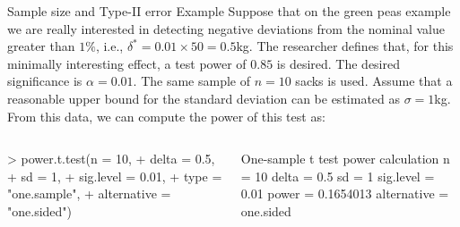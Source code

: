 \documentclass[t]{beamer}
\begin{document}
\begin{ftstf}
{Sample size and Type-II error}
{Example}
Suppose that on the green peas example we are really interested in detecting negative deviations from the nominal value greater than $1\%$, i.e., $\delta^* = 0.01\times 50 = 0.5$kg. The researcher defines that, for this minimally interesting effect, a test power of $0.85$ is desired. The desired significance is $\alpha = 0.01$.
\vone
The same sample of $n=10$ sacks is used. Assume that a reasonable upper bound for the standard deviation can be estimated as $\sigma=1$kg. From this data, we can compute the power of this test as:
\begin{columns}
\begin{rcode}
> power.t.test(n = 10, 
+        delta = 0.5, 
+        sd = 1, 
+        sig.level = 0.01, 
+        type = "one.sample", 
+        alternative = "one.sided")
\end{rcode}
\begin{rcode}
One-sample t test power calculation 
n = 10
delta = 0.5
sd = 1
sig.level = 0.01
power = 0.1654013
alternative = one.sided
\end{rcode}
\end{columns}
\end{ftstf}

\end{document}
